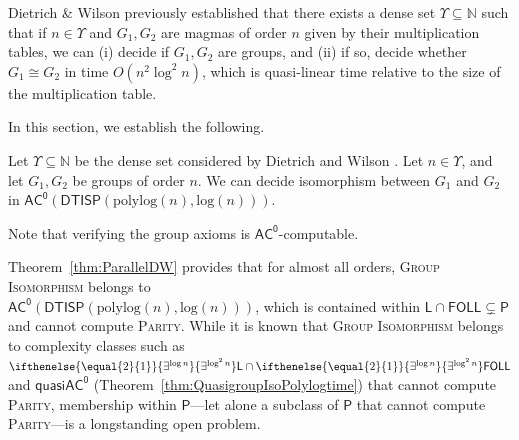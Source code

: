 \documentclass{theoretics}
\newcommand{\algprobm}[1]{\textsc{#1}\xspace}
\newcommand{\betacc}[1]{\ifthenelse{\equal{#1}{1}}{\exists^{\log n}}{\exists^{\log^{#1}n}}} %
\newcommand*{\ComplexityClass}[1]{\ensuremath{\mathsf{#1}}\xspace}
\newcommand{\DTISP}{\ComplexityClass{DTISP}}
\newcommand{\DTISPpll}{\ensuremath{\DTISP(\mathrm{polylog}(n),\mathrm{log}(n))}\xspace}
\newcommand*{\LogSpace}{\ComplexityClass{L}}
\newcommand{\ACz}{\ComplexityClass{AC^0}}
\newcommand{\qACz}{\ComplexityClass{quasiAC^0}}
\newcommand{\FOLL}{\ComplexityClass{FOLL}}
\begin{document}
Dietrich \& Wilson \cite{DietrichWilson} previously established that there exists a dense set $\Upsilon \subseteq \mathbb{N}$ such that if $n \in \Upsilon$ and $G_{1}, G_{2}$ are magmas of order $n$ given by their multiplication tables, we can (i) decide if $G_{1}, G_{2}$ are groups, and (ii) if so, decide whether $G_{1} \cong G_{2}$ in time $O(n^{2} \log^{2} n)$, which is quasi-linear time relative to the size of the multiplication table.

In this section, we establish the following.

\begin{theorem} \label{thm:ParallelDW}
Let $\Upsilon \subseteq \mathbb{N}$ be the dense set considered by Dietrich and Wilson \cite{DietrichWilson}. Let $n \in \Upsilon$, and let $G_{1}, G_{2}$ be groups of order $n$. We can decide isomorphism between $G_{1}$ and $G_{2}$ in $\ACz(\DTISPpll)$.   
\end{theorem}

Note that verifying the group axioms is $\ACz$-computable. 

\begin{remark}
Theorem~\ref{thm:ParallelDW} provides that for almost all orders, \algprobm{Group Isomorphism} belongs to \\$\ACz(\DTISPpll)$, which is contained within $\LogSpace \cap \FOLL \subsetneq \mathsf{P}$ and cannot compute \algprobm{Parity}. While it is known that \algprobm{Group Isomorphism} belongs to complexity classes such as $\betacc{2}\LogSpace \cap \betacc{2}\mathsf{FOLL}$ \cite{ChattopadhyayToranWagner} and $\qACz$ (Theorem~\ref{thm:QuasigroupIsoPolylogtime}) that cannot compute \algprobm{Parity}, membership within $\mathsf{P}$---let alone a subclass of $\mathsf{P}$ that cannot compute \algprobm{Parity}---is a longstanding open problem.
\end{remark}
\end{document}
